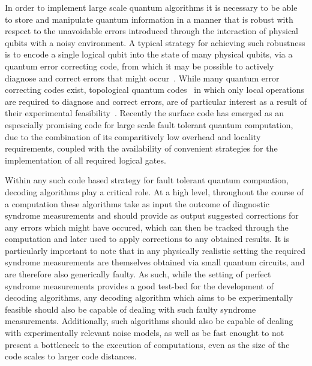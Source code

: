 \documentclass[onecolumn,preprintnumbers,amsmath,amssymb,notitlepage,nofootinbib,longbibliography,superscriptaddress,aps,pra,10pt]{revtex4-1}
\begin{document}
	In order to implement large scale quantum algorithms it is necessary to be able to store and manipulate quantum information in a manner that is robust with respect to the unavoidable errors introduced through the interaction of physical qubits with a noisy environment.
	A typical strategy for achieving such robustness is to encode a single logical qubit into the state of many physical qubits, via a quantum error correcting code, from which it may be possible to actively diagnose and correct errors that might occur~\cite{Terhal15,Campbell17}.
	While many quantum error correcting codes exist, topological quantum codes~\cite{Kitaev03, Dennis02, Preskill17lectures, Nayak08, Pachos12, Terhal15, Brown16, Campbell17} in which only local operations are required to diagnose and correct errors, are of particular interest as a result of their experimental feasibility~\cite{Reed12, Barends14, Nigg14, Corcoles15, Albrecht16, Takita16, Linke17}.
	Recently the surface code has emerged as an espescially promising code for large scale fault tolerant quantum computation, due to the combination of its comparitively low overhead and locality requirements, coupled with the availability of convenient strategies for the implementation of all required logical gates.

	Within any such code based strategy for fault tolerant quantum compuation, decoding algorithms play a critical role.
	At a high level, throughout the course of a computation these algorithms take as input the outcome of diagnostic syndrome measurements and should provide as output suggested corrections for any errors which might have occured, which can then be tracked through the computation and later used to apply corrections to any obtained results.
	It is particularly important to note that in any physically realistic setting the required syndrome measurements are themselves obtained via small quantum circuits, and are therefore also generically faulty.
	As such, while the setting of perfect syndrome measurements provides a good test-bed for the development of decoding algorithms, any decoding algorithm which aims to be experimentally feasible should also be capable of dealing with such faulty syndrome measurements.
	Additionally, such algorithms should also be capable of dealing with experimentally relevant noise models, as well as be fast enought to not present a bottleneck to the execution of computations, even as the size of the code scales to larger code distances.
\end{document}
